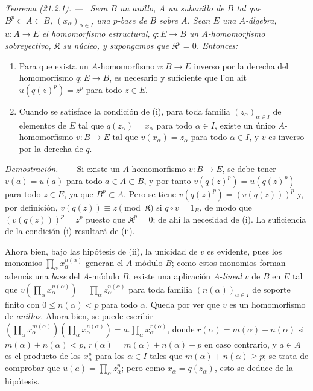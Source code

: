 \documentclass[10pt,oneside]{book}
\makeatletter
\newcommand{\setmanualcurrentlabel}[1]{\def\@currentlabel{#1}}
\newcommand{\oldpage}[2][]{%
  \setcounter{footnote}{0}%
  \marginpar{\scriptsize\textbf{#1}~|~#2}\ignorespaces}
\newenvironment{theorem}[1][]{%
  \setmanualcurrentlabel{#1}\par\medskip\noindent\itshape Teorema (#1). ---\ }{\par}
\newenvironment{proof}{%
  \par\medskip\noindent\textit{Demostración. ---\ }}{\par}
\providecommand{\setmin}{-}%
\makeatother
\begin{document}
\begin{theorem}[21.2.1]
\label{0.21.2.1-es}
Sean $B$ un anillo, $A$ un subanillo de $B$ tal que $B^p\subset A\subset B$,
$(x_\alpha)_{\alpha\in I}$ una $p$-base de $B$ sobre $A$.
Sean $E$ una $A$-álgebra, $u:A\to E$ el homomorfismo estructural,
$q:E\to B$ un $A$-homomorfismo sobreyectivo, $\mathfrak K$ su núcleo, y
supongamos que $\mathfrak K^p=0$. Entonces:
\begin{enumerate}
  \item[\textup{(i)}] Para que exista un $A$-homomorfismo $v:B\to E$ inverso por la
  derecha del homomorfismo $q:E\to B$, es necesario y suficiente que l'on ait
  $u(q(z)^p)=z^p$ para todo $z\in E$.
  \item[\textup{(ii)}] Cuando se satisface la condición de \textup{(i)}, para toda familia
  $(z_\alpha)_{\alpha\in I}$ de elementos de $E$ tal que
  $q(z_\alpha)=x_\alpha$ para todo $\alpha\in I$, existe un único
  $A$-homomorfismo $v:B\to E$ tal que $v(x_\alpha)=z_\alpha$ para todo
  $\alpha\in I$, y $v$ es inverso por la derecha de $q$.
\end{enumerate}
\end{theorem}

\begin{proof}
Si existe un $A$-homomorfismo $v:B\to E$, se debe tener $v(a)=u(a)$ para
todo $a\in A\subset B$, y por tanto $v(q(z)^p)=u(q(z)^p)$ para todo $z\in E$,
ya que $B^p\subset A$. Pero se tiene $v(q(z)^p)=(v(q(z)))^p$ y, por definición,
$v(q(z))\equiv z\pmod{\mathfrak K}$ si $q\circ v=1_B$, de modo que
$(v(q(z)))^p=z^p$ puesto que $\mathfrak K^p=0$; de ahí la necesidad de (i).
La suficiencia de la condición (i) resultará de (ii).

Ahora bien, bajo las hipótesis de (ii), la unicidad de $v$ es evidente, pues
los monomios $\prod_\alpha x_\alpha^{n(\alpha)}$ generan el $A$-módulo $B$;
como estos monomios forman además una \emph{base} del $A$-módulo $B$, existe
una aplicación $A$-\emph{lineal} $v$ de $B$ en $E$ tal que
$v(\prod_\alpha x_\alpha^{n(\alpha)})=\prod_\alpha z_\alpha^{n(\alpha)}$
para toda familia $(n(\alpha))_{\alpha\in I}$ de soporte finito con
$0\leq n(\alpha)<p$ para todo $\alpha$. Queda por ver que $v$ es un
homomorfismo de \emph{anillos}. Ahora bien, se puede escribir
$(\prod_\alpha x_\alpha^{m(\alpha)})(\prod_\alpha x_\alpha^{n(\alpha)})
=a.\prod_\alpha x_\alpha^{r(\alpha)}$, donde
$r(\alpha)=m(\alpha)+n(\alpha)$ si $m(\alpha)+n(\alpha)<p$,
$r(\alpha)=m(\alpha)+n(\alpha)\setmin p$ en caso contrario, y $a\in A$
\oldpage[0\textsubscript{IV-1}]{158}
es el producto de los $x_\alpha^p$ para los $\alpha\in I$ tales que
$m(\alpha)+n(\alpha)\geq p$; se trata de comprobar que
$u(a)=\prod_\alpha z_\alpha^p$; pero como $x_\alpha=q(z_\alpha)$, esto se
deduce de la hipótesis.
\end{proof}
\end{document}
